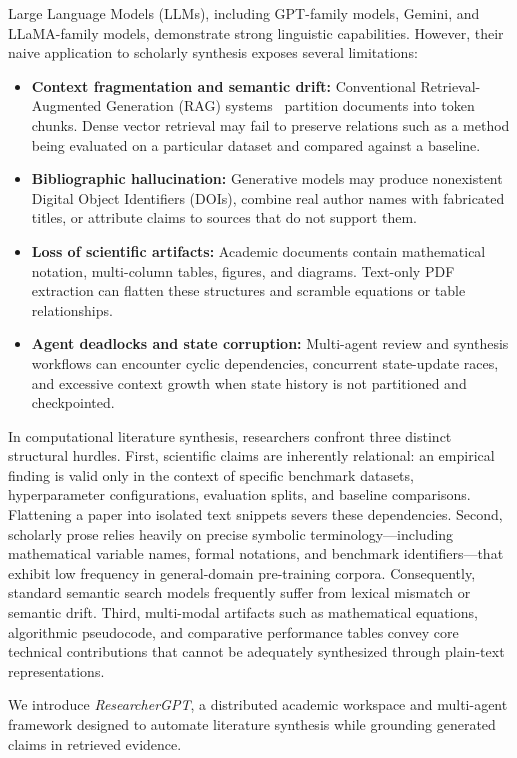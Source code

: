 \documentclass[conference]{IEEEtran}
\begin{document}
Large Language Models (LLMs), including GPT-family models, Gemini, and LLaMA-family models, demonstrate strong linguistic capabilities. However, their naive application to scholarly synthesis exposes several limitations:
\begin{itemize}
\item \textbf{Context fragmentation and semantic drift:} Conventional Retrieval-Augmented Generation (RAG) systems~\cite{lewis2020rag} partition documents into token chunks. Dense vector retrieval may fail to preserve relations such as a method being evaluated on a particular dataset and compared against a baseline.
\item \textbf{Bibliographic hallucination:} Generative models may produce nonexistent Digital Object Identifiers (DOIs), combine real author names with fabricated titles, or attribute claims to sources that do not support them.
\item \textbf{Loss of scientific artifacts:} Academic documents contain mathematical notation, multi-column tables, figures, and diagrams. Text-only PDF extraction can flatten these structures and scramble equations or table relationships.
\item \textbf{Agent deadlocks and state corruption:} Multi-agent review and synthesis workflows can encounter cyclic dependencies, concurrent state-update races, and excessive context growth when state history is not partitioned and checkpointed.
\end{itemize}

In computational literature synthesis, researchers confront three distinct structural hurdles. First, scientific claims are inherently relational: an empirical finding is valid only in the context of specific benchmark datasets, hyperparameter configurations, evaluation splits, and baseline comparisons. Flattening a paper into isolated text snippets severs these dependencies. Second, scholarly prose relies heavily on precise symbolic terminology---including mathematical variable names, formal notations, and benchmark identifiers---that exhibit low frequency in general-domain pre-training corpora. Consequently, standard semantic search models frequently suffer from lexical mismatch or semantic drift. Third, multi-modal artifacts such as mathematical equations, algorithmic pseudocode, and comparative performance tables convey core technical contributions that cannot be adequately synthesized through plain-text representations.

We introduce \textit{ResearcherGPT}, a distributed academic workspace and multi-agent framework designed to automate literature synthesis while grounding generated claims in retrieved evidence.
\end{document}

